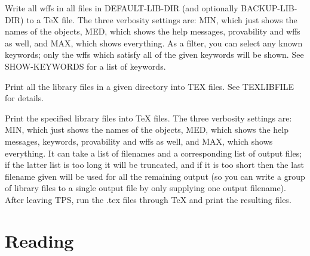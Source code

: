 \begin{description}
\item[TEX-ALL-WFFS]  
Write all wffs in all files in DEFAULT-LIB-DIR (and optionally BACKUP-LIB-DIR)
to a TeX file. 
The three verbosity settings are: MIN, which just shows the names of the 
objects, MED, which shows the help messages, provability and wffs as well, and MAX, 
which shows everything.
As a filter, you can select any known keywords; only the wffs which 
satisfy all of the given keywords will be shown. See SHOW-KEYWORDS 
for a list of keywords.

\item[TEXLIBDIR]  
Print all the library files in a given directory into 
TEX files. See TEXLIBFILE for details.

\item[TEXLIBFILE]  
Print the specified library files into TeX files.
The three verbosity settings are: MIN, which just shows the names of the 
objects, MED, which shows the help messages, keywords, provability and wffs 
as well, and MAX, which shows everything. It can take a list of filenames 
and a corresponding list of output files; if the latter list is too long it 
will be truncated, and if it is too short then the last filename given will 
be used for all the remaining output (so you can write a group of library 
files to a single output file by only supplying one output filename).  
After leaving TPS, run the .tex files through TeX and print the resulting
files.
\item
\end{description}

\section{Reading}

